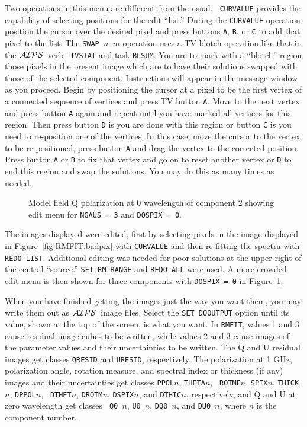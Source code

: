 \documentclass[twoside]{article}
\newcommand{\AIPS}{{$\cal AIPS\/$}}
\newcommand{\putfig}[1]{\texttt{[image: \#1.eps]}}
\begin{document}
Two operations in this menu are different from the usual.  {\tt
  CURVALUE} provides the capability of selecting positions for the
edit ``list.''  During the {\tt CURVALUE} operation position the
cursor over the desired pixel and press buttons {\tt A}, {\tt B}, or
{\tt C} to add that pixel to the list.  The {\tt SWAP $n$-$m$}
operation uses a TV blotch operation like that in the \AIPS\ verb {\tt
  TVSTAT} and task {\tt BLSUM}\@.  You are to mark with a ``blotch''
region those pixels in the present image which are to have their
solutions swapped with those of the selected component.  Instructions
will appear in the message window as you proceed.  Begin by
positioning the cursor at a pixel to be the first vertex of a
connected sequence of vertices and press TV button {\tt A}\@.  Move to
the next vertex and press button {\tt A} again and repeat until you
have marked all vertices for this region.  Then press button {\tt D}
is you are done with this region or button {\tt C} is you need to
re-position one of the vertices.  In this case, move the cursor to the
vertex to be re-positioned, press button {\tt A} and drag the vertex to
the corrected position.  Press button {\tt A} or {\tt B} to fix that
vertex and go on to reset another vertex or {\tt D} to end this region
and swap the solutions.  You may do this as many times as needed.

\begin{figure}
\begin{center}
\resizebox{6.0in}{!}{\putfig{RMFIT.3cedit}}
\caption{Model field Q polarization at 0 wavelength of component 2
  showing edit menu for {\tt NGAUS = 3} and {\tt DOSPIX = 0}.}
\label{fig:RMFIT.3cedit}
\end{center}
\end{figure}

The images displayed were edited, first by selecting pixels in the
image displayed in Figure~\ref{fig:RMFIT.badpix} with {\tt CURVALUE}
and then re-fitting the spectra with {\tt REDO LIST}\@.  Additional
editing was needed for poor solutions at the upper right of the
central ``source.''  {\tt SET RM RANGE} and {\tt REDO ALL} were used.
A more crowded edit menu is then shown for three components with
{\tt DOSPIX = 0} in Figure~\ref{fig:RMFIT.3cedit}.

When you have finished getting the images just the way you want them,
you may write them out as \AIPS\ image files.  Select the {\tt SET
  DOOUTPUT} option until its value, shown at the top of the screen, is
what you want.  In {\tt RMFIT}, values 1 and 3 cause residual image
cubes to be written, while values 2 and 3 cause images of the
parameter values and their uncertainties to be written.  The Q and U
residual images get classes {\tt QRESID} and {\tt URESID},
respectively.  The polarization at 1 GHz, polarization angle, rotation
measure, and spectral index or thickness (if any) images and their
uncertainties get classes {\tt PPOL$n$}, {\tt THETA$n$}, {\tt
  ROTME$n$}, {\tt SPIX$n$}, {\tt THICK$n$}, {\tt DPPOL$n$}, {\tt
  DTHET$n$}, {\tt DROTM$n$}, {\tt DSPIX$n$}, and {\tt DTHIC$n$},
respectively, and Q and U at zero wavelength get classes {\tt
  Q0\_$n$}, {\tt U0\_$n$}, {\tt DQ0\_$n$}, and  {\tt DU0\_$n$}, where
$n$ is the component number.
\vfill\eject
\end{document}
